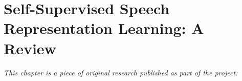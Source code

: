 
\chapter[self"=supervised speech representation learning: a review]{Self-Supervised Speech Representation Learning: A Review}
\label{app:paper-review}

\textit{This chapter is a piece of original research published as part of the project:} \newline
\begin{center}
    \begin{enumerate}[leftmargin=8mm,rightmargin=8mm,topsep=0mm,label={[\Alph*]}]
        \setcounter{enumi}{6}
        \item {} \co
        \end{enumerate}
\end{center}

